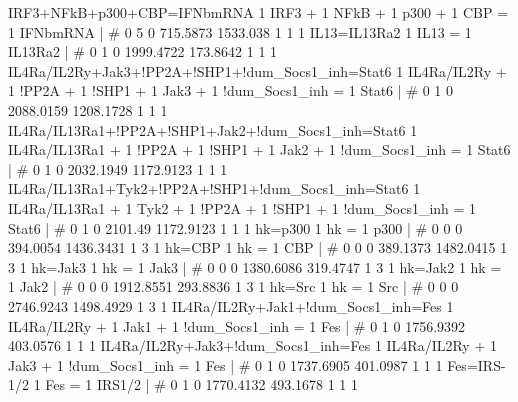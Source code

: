 IRF3+NFkB+p300+CBP=IFNbmRNA                         	1 IRF3 + 1 NFkB + 1 p300 + 1 CBP = 1 IFNbmRNA 	| 	# 	0              5              0       715.5873       1533.038              1              1              1 
IL13=IL13Ra2                                        	1 IL13 = 1 IL13Ra2 	| 	# 	0              1              0      1999.4722       173.8642              1              1              1 
IL4Ra/IL2Ry+Jak3+!PP2A+!SHP1+!dum_Socs1_inh=Stat6   	1 IL4Ra/IL2Ry + 1 !PP2A + 1 !SHP1 + 1 Jak3 + 1 !dum_Socs1_inh = 1 Stat6 	| 	# 	0              1              0      2088.0159      1208.1728              1              1              1 
IL4Ra/IL13Ra1+!PP2A+!SHP1+Jak2+!dum_Socs1_inh=Stat6 	1 IL4Ra/IL13Ra1 + 1 !PP2A + 1 !SHP1 + 1 Jak2 + 1 !dum_Socs1_inh = 1 Stat6 	| 	# 	0              1              0      2032.1949      1172.9123              1              1              1 
IL4Ra/IL13Ra1+Tyk2+!PP2A+!SHP1+!dum_Socs1_inh=Stat6 	1 IL4Ra/IL13Ra1 + 1 Tyk2 + 1 !PP2A + 1 !SHP1 + 1 !dum_Socs1_inh = 1 Stat6 	| 	# 	0              1              0        2101.49      1172.9123              1              1              1 
hk=p300                                             	1 hk = 1 p300 	| 	# 	0              0              0       394.0054      1436.3431              1              3              1 
hk=CBP                                              	1 hk = 1 CBP 	| 	# 	0              0              0       389.1373      1482.0415              1              3              1 
hk=Jak3                                             	1 hk = 1 Jak3 	| 	# 	0              0              0      1380.6086       319.4747              1              3              1 
hk=Jak2                                             	1 hk = 1 Jak2 	| 	# 	0              0              0      1912.8551       293.8836              1              3              1 
hk=Src                                              	1 hk = 1 Src 	| 	# 	0              0              0      2746.9243      1498.4929              1              3              1 
IL4Ra/IL2Ry+Jak1+!dum_Socs1_inh=Fes                 	1 IL4Ra/IL2Ry + 1 Jak1 + 1 !dum_Socs1_inh = 1 Fes 	| 	# 	0              1              0      1756.9392       403.0576              1              1              1 
IL4Ra/IL2Ry+Jak3+!dum_Socs1_inh=Fes                 	1 IL4Ra/IL2Ry + 1 Jak3 + 1 !dum_Socs1_inh = 1 Fes 	| 	# 	0              1              0      1737.6905       401.0987              1              1              1 
Fes=IRS-1/2                                         	1 Fes = 1 IRS1/2 	| 	# 	0              1              0      1770.4132       493.1678              1              1              1 
